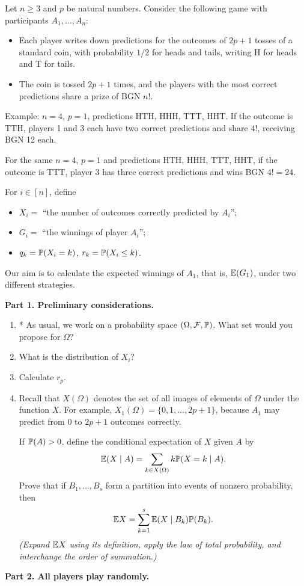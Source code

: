 \documentclass[a4paper]{report}
\begin{document}
\begin{problem}
Let $n\geq3$ and $p$ be natural numbers. Consider the following game with participants $A_1,\dots,A_n$:
\begin{itemize}
\item Each player writes down predictions for the outcomes of $2p+1$ tosses of a standard coin, with probability $1/2$ for heads and tails, writing H for heads and T for tails.
\item The coin is tossed $2p+1$ times, and the players with the most correct predictions share a prize of BGN $n!$.
\end{itemize}
Example: $n=4$, $p=1$, predictions HTH, HHH, TTT, HHT. If the outcome is TTH, players 1 and 3 each have two correct predictions and share $4!$, receiving BGN 12 each.

For the same $n=4$, $p=1$ and predictions HTH, HHH, TTT, HHT, if the outcome is TTT, player 3 has three correct predictions and wins BGN $4!=24$.

For $i\in[n]$, define
\begin{itemize}
\item $X_i=$ ``the number of outcomes correctly predicted by $A_i$'';
\item $G_i=$ ``the winnings of player $A_i$'';
\item $q_k=\P(X_i=k)$, $r_k=\P(X_i\leq k)$.
\end{itemize}
Our aim is to calculate the expected winnings of $A_1$, that is, $\E(G_1)$, under two different strategies.

\textbf{Part 1. Preliminary considerations.}
\begin{enumerate}
\item* As usual, we work on a probability space $(\Omega,\cF,\P)$. What set would you propose for $\Omega$?
\item What is the distribution of $X_i$?
\item Calculate $r_p$.
\item Recall that $X(\Omega)$ denotes the set of all images of elements of $\Omega$ under the function $X$. For example, $X_1(\Omega)=\{0,1,\dots,2p+1\}$, because $A_1$ may predict from 0 to $2p+1$ outcomes correctly.

If $\P(A)>0$, define the conditional expectation of $X$ given $A$ by
\[\E(X\mid A)=\sum_{k\in X(\Omega)}k\P(X=k\mid A).\]
Prove that if $B_1,\dots,B_s$ form a partition into events of nonzero probability, then
\[\E X=\sum_{k=1}^s\E(X\mid B_k)\P(B_k).\]
\textit{(Expand $\E X$ using its definition, apply the law of total probability, and interchange the order of summation.)}
\end{enumerate}
\textbf{Part 2. All players play randomly.}


\end{problem}
\end{document}
